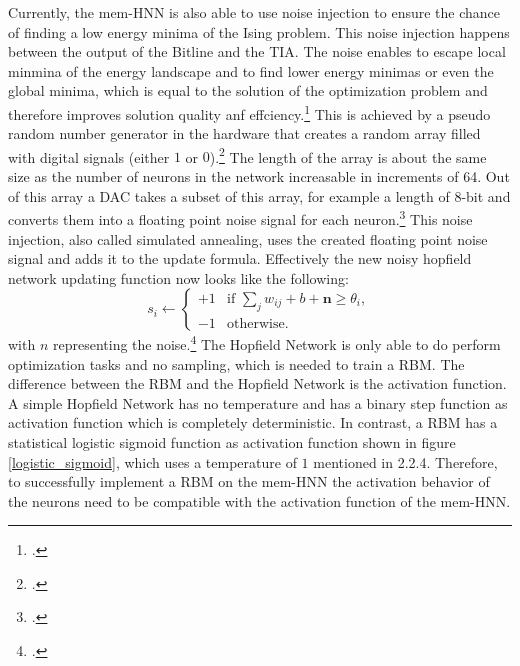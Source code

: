 Currently, the \ac{mem-HNN} is also able to use noise injection to ensure the chance of finding a low energy minima of the Ising problem.
This noise injection happens between the output of the Bitline and the \ac{TIA}. 
The noise enables to escape local minmina of the energy landscape and to find lower energy minimas or even the global minima, which is equal to the solution of the optimization problem and therefore improves solution quality anf effciency.\footcite[cf.][410]{caiPowerefficientCombinatorialOptimization2020} 
This is achieved by a pseudo random number generator in the hardware that creates a random array filled with digital signals (either \(1\) or \(0\)).\footcite[cf.][22]{caiHarnessingIntrinsicNoise2019}
The length of the array is about the same size as the number of neurons in the network increasable in increments of 64. 
Out of this array a \ac{DAC} takes a subset of this array, for example a length of 8-bit and converts them into a floating point noise signal for each neuron.\footcite[cf.][3]{hizzaniMemristorbasedHardwareAlgorithms2023}
This noise injection, also called simulated annealing, uses the created floating point noise signal and adds it to the update formula.
Effectively the new noisy hopfield network updating function now looks like the following: 
\begin{equation}
    s_i \leftarrow 
    \begin{cases} 
    +1 & \text{if } \sum_j w_{ij}  + b + \mathbf{n} \geq \theta_i, \\
    -1 & \text{otherwise}.
    \end{cases}
\end{equation}
with \(n\) representing the noise.\footcite[cf.][410]{caiPowerefficientCombinatorialOptimization2020} 
The Hopfield Network is only able to do perform optimization tasks and no sampling, which is needed to train a \ac{RBM}.
The difference between the \ac{RBM} and the Hopfield Network is the activation function.
A simple Hopfield Network has no temperature and has a binary step function as activation function which is completely deterministic.
In contrast, a \ac{RBM} has a statistical logistic sigmoid function as activation function shown in figure \ref{logistic_sigmoid}, which uses a temperature of \(1\) mentioned in 2.2.4.
Therefore, to successfully implement a \ac{RBM} on the \ac{mem-HNN} the activation behavior of the neurons need to be compatible with the activation function of the \ac{mem-HNN}.

